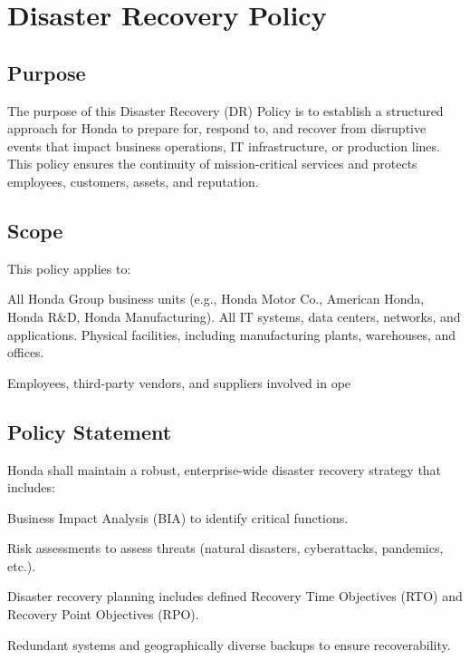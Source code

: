 \chapter{Disaster Recovery Policy}
\pagestyle{fancy}

\fancyhf{}

\fancyfoot[C]{\thepage}

\renewcommand{\headrulewidth}{0pt}
\renewcommand{\footrulewidth}{0pt}

\section{Purpose}
The purpose of this Disaster Recovery (DR) Policy is to establish a structured approach for Honda to prepare for, respond to, and recover from disruptive events that impact business operations, IT infrastructure, or production lines. This policy ensures the continuity of mission-critical services and protects employees, customers, assets, and reputation.
\section{Scope}

This policy applies to:

    All Honda Group business units (e.g., Honda Motor Co., American Honda, Honda R\&D, Honda Manufacturing).
    All IT systems, data centers, networks, and applications.
    Physical facilities, including manufacturing plants, warehouses, and offices.

Employees, third-party vendors, and suppliers involved in ope
\section{Policy Statement}

Honda shall maintain a robust, enterprise-wide disaster recovery strategy that includes:

Business Impact Analysis (BIA) to identify critical functions.

Risk assessments to assess threats (natural disasters, cyberattacks, pandemics, etc.).

Disaster recovery planning includes defined Recovery Time Objectives (RTO) and Recovery Point Objectives (RPO).

Redundant systems and geographically diverse backups to ensure recoverability.

